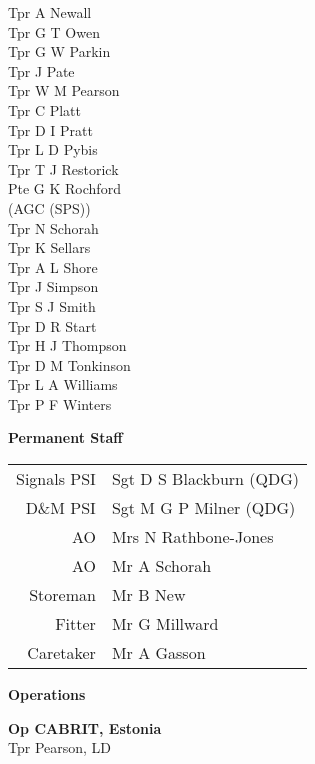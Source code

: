 \begin{multicols}{3}
  Tpr A Newall \\
  Tpr G T Owen \\
  Tpr G W Parkin \\
  Tpr J Pate \\
  Tpr W M Pearson \\
  Tpr C Platt \\
  Tpr D I Pratt \\
  Tpr L D Pybis \\
  Tpr T J Restorick \\
  Pte G K Rochford \\ \indent (AGC (SPS)) \\
  Tpr N Schorah \\
  Tpr K Sellars \\
  Tpr A L Shore \\
  Tpr J Simpson \\
  Tpr S J Smith \\
  Tpr D R Start \\
  Tpr H J Thompson \\
  Tpr D M Tonkinson \\
  Tpr L A Williams \\
  Tpr P F Winters \\
\end{multicols}

\pagebreak

\vspace*{10mm}

\begin{center}
  \Large
  \textbf{Permanent Staff}
\end{center}

\begin{center}
  \small
  \begin{tabular}{rl}
    Signals PSI & Sgt D S Blackburn (QDG) \\
    D\&M PSI & Sgt M G P Milner (QDG) \\
    AO & Mrs N Rathbone-Jones \\
    AO & Mr A Schorah \\
    Storeman & Mr B New \\
    Fitter & Mr G Millward \\
    Caretaker & Mr A Gasson \\
  \end{tabular}
\end{center}

\vspace*{10mm}

\begin{center}
  \Large
  \textbf{Operations}
\end{center}

\begin{center}
  \noindent
  \textbf{Op CABRIT, Estonia} \\
  Tpr Pearson, LD \\
\end{center}
